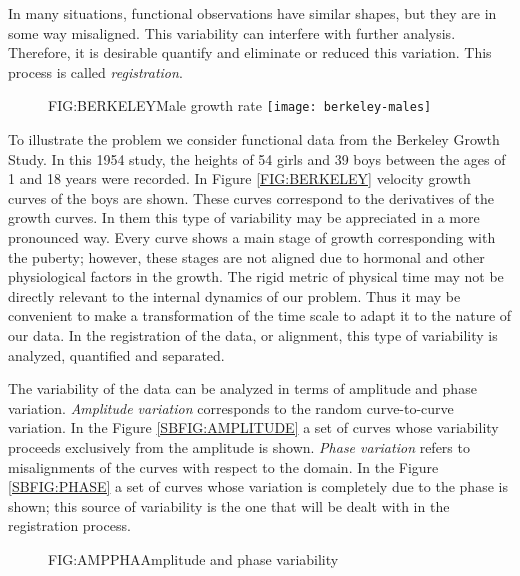 In many situations, functional observations have
similar shapes, but they are in some way misaligned. This variability can
interfere with further analysis. Therefore, it is desirable quantify and
eliminate or reduced this variation. This process is called \textit{registration}.


\begin{figure}[Male growth rate]{FIG:BERKELEY}{Male growth rate}
	\texttt{[image: berkeley-males]}
\end{figure}

To illustrate the problem we consider functional data from the Berkeley Growth
Study\cite{berkeley}. In this 1954 study, the heights of 54
girls and 39 boys between the ages of 1 and 18 years were recorded. In Figure
\ref{FIG:BERKELEY} velocity growth curves of the boys are shown.
These curves correspond to the derivatives of the growth curves. In them this
type of variability may be appreciated in a more pronounced way.
Every curve shows a main stage of growth corresponding with the puberty;
however, these stages are not aligned due to hormonal and other
physiological factors in the growth. The rigid metric of physical time may not
be directly relevant to the internal dynamics of our problem. Thus it may be
convenient to make a transformation of the time scale to adapt it to the nature
of our data. In the registration of the data, or alignment, this type of
variability is analyzed, quantified and separated.


The variability of the data can be analyzed in terms of amplitude and
phase variation. \textit{Amplitude variation} corresponds to the
random curve-to-curve variation.
In the Figure \ref{SBFIG:AMPLITUDE} a
set of curves whose variability proceeds exclusively from the amplitude is shown.
\textit{Phase variation} refers to
misalignments of the curves with respect to the
domain. In the Figure
\ref{SBFIG:PHASE} a set of curves whose variation is completely due
to the phase is shown; this source of variability is the one that will be dealt with in
the registration process.

\begin{figure}[Amplitude and phase variability]{FIG:AMPPHA}{Amplitude and phase variability}
   \quad
\end{figure}
